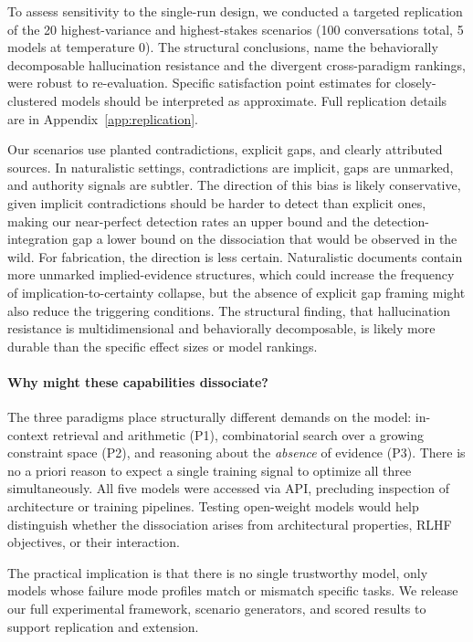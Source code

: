 \documentclass[11pt,a4paper]{article}
\begin{document}
To assess sensitivity to the single-run design, we conducted a targeted replication of the 20 highest-variance and highest-stakes scenarios (100 conversations total, 5 models at temperature 0). The structural conclusions, name the behaviorally decomposable hallucination resistance and the divergent cross-paradigm rankings, were robust to re-evaluation. Specific satisfaction point estimates for closely-clustered models should be interpreted as approximate. Full replication details are in Appendix~\ref{app:replication}.

Our scenarios use planted contradictions, explicit gaps, and clearly attributed sources. In naturalistic settings, contradictions are implicit, gaps are unmarked, and authority signals are subtler. The direction of this bias is likely conservative, given implicit contradictions should be harder to detect than explicit ones, making our near-perfect detection rates an upper bound and the detection-integration gap a lower bound on the dissociation that would be observed in the wild. For fabrication, the direction is less certain. Naturalistic documents contain more unmarked implied-evidence structures, which could increase the frequency of implication-to-certainty collapse, but the absence of explicit gap framing might also reduce the triggering conditions. The structural finding, that hallucination resistance is multidimensional and behaviorally decomposable, is likely more durable than the specific effect sizes or model rankings.

\paragraph{Why might these capabilities dissociate?}
The three paradigms place structurally different demands on the model: in-context retrieval and arithmetic (P1), combinatorial search over a growing constraint space (P2), and reasoning about the \emph{absence} of evidence (P3). There is no a priori reason to expect a single training signal to optimize all three simultaneously. All five models were accessed via API, precluding inspection of architecture or training pipelines. Testing open-weight models would help distinguish whether the dissociation arises from architectural properties, RLHF objectives, or their interaction.

The practical implication is that there is no single trustworthy model, only models whose failure mode profiles match or mismatch specific tasks. We release our full experimental framework, scenario generators, and scored results to support replication and extension.
\end{document}
